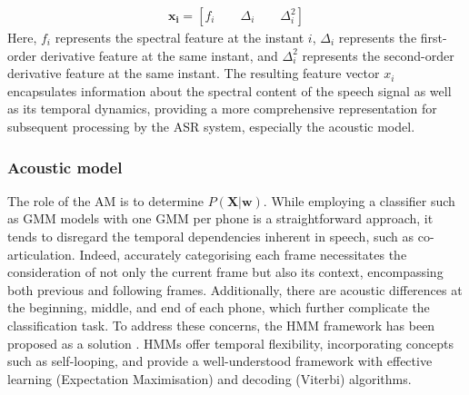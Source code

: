 \begin{align}
    \boldsymbol{x_i} = [f_i \qquad \Delta_i \qquad \Delta^{2}_i]
\end{align}
Here, $f_i$ represents the spectral feature at the instant $i$, $\Delta_i$ represents the first-order derivative feature at the same instant, and $\Delta^2_i$ represents the second-order derivative feature at the same instant. The resulting feature vector $x_i$ encapsulates information about the spectral content of the speech signal as well as its temporal dynamics, providing a more comprehensive representation for subsequent processing by the \ac{ASR} system, especially the acoustic model.


\subsubsection{Acoustic model}%
The role of the \ac{AM} is to determine $P(\boldsymbol{X}|\boldsymbol{w})$. While employing a classifier such as \ac{GMM} models with one \ac{GMM} per phone is a straightforward approach, it tends to disregard the temporal dependencies inherent in speech, such as co-articulation. Indeed, accurately categorising each frame necessitates the consideration of not only the current frame but also its context, encompassing both previous and following frames. Additionally, there are acoustic differences at the beginning, middle, and end of each phone, which further complicate the classification task. To address these concerns, the \ac{HMM} framework has been proposed as a solution \cite{Dragon_system}. \acp{HMM} offer temporal flexibility, incorporating concepts such as self-looping, and provide a well-understood framework with effective learning (Expectation Maximisation) and decoding (Viterbi) algorithms. 


